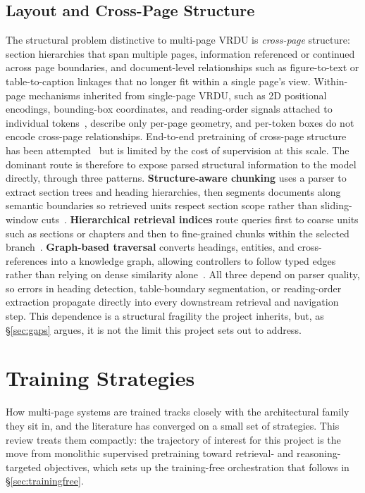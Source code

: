 \documentclass[11pt]{article}
\begin{document}
\subsection{Layout and Cross-Page Structure}
The structural problem distinctive to multi-page VRDU is \emph{cross-page} structure: section hierarchies that span multiple pages, information referenced or continued across page boundaries, and document-level relationships such as figure-to-text or table-to-caption linkages that no longer fit within a single page's view. Within-page mechanisms inherited from single-page VRDU, such as 2D positional encodings, bounding-box coordinates, and reading-order signals attached to individual tokens~\cite{ding2025survey}, describe only per-page geometry, and per-token boxes do not encode cross-page relationships. End-to-end pretraining of cross-page structure has been attempted~\cite{hu2025mplug2,duan2025docopilot} but is limited by the cost of supervision at this scale. The dominant route is therefore to expose parsed structural information to the model directly, through three patterns. \textbf{Structure-aware chunking} uses a parser to extract section trees and heading hierarchies, then segments documents along semantic boundaries so retrieved units respect section scope rather than sliding-window cuts~\cite{shin2025multidocfusion}. \textbf{Hierarchical retrieval indices} route queries first to coarse units such as sections or chapters and then to fine-grained chunks within the selected branch~\cite{gong2025mhier,zhang2026mldocrag}. \textbf{Graph-based traversal} converts headings, entities, and cross-references into a knowledge graph, allowing controllers to follow typed edges rather than relying on dense similarity alone~\cite{wang2024knowledge}. All three depend on parser quality, so errors in heading detection, table-boundary segmentation, or reading-order extraction propagate directly into every downstream retrieval and navigation step. This dependence is a structural fragility the project inherits, but, as \S\ref{sec:gaps} argues, it is not the limit this project sets out to address.

\section{Training Strategies}
\label{sec:training}

How multi-page systems are trained tracks closely with the architectural family they sit in, and the literature has converged on a small set of strategies. This review treats them compactly: the trajectory of interest for this project is the move from monolithic supervised pretraining toward retrieval- and reasoning-targeted objectives, which sets up the training-free orchestration that follows in \S\ref{sec:trainingfree}.
\end{document}
